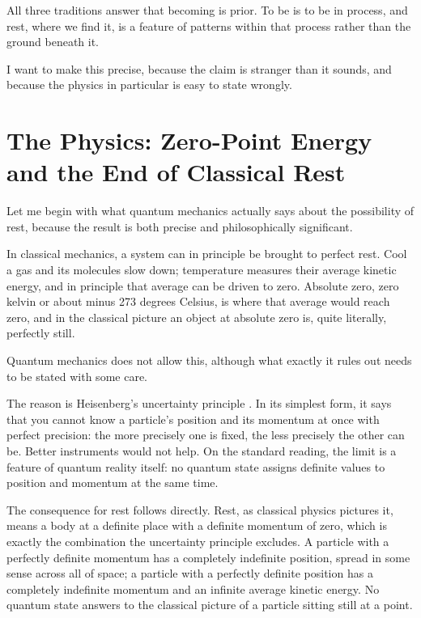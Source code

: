 All three traditions answer that becoming is prior. To be is to be in process, and rest, where we find it, is a feature of patterns within that process rather than the ground beneath it.

I want to make this precise, because the claim is stranger than it sounds, and because the physics in particular is easy to state wrongly.


\section{The Physics: Zero-Point Energy and the End of Classical Rest}
\label{sec:ch12-physics}

Let me begin with what quantum mechanics actually says about the possibility of rest, because the result is both precise and philosophically significant.

In classical mechanics, a system can in principle be brought to perfect rest. Cool a gas and its molecules slow down; temperature measures their average kinetic energy, and in principle that average can be driven to zero. Absolute zero, zero kelvin or about minus 273 degrees Celsius, is where that average would reach zero, and in the classical picture an object at absolute zero is, quite literally, perfectly still.

Quantum mechanics does not allow this, although what exactly it rules out needs to be stated with some care.

The reason is Heisenberg's uncertainty principle \citep{Heisenberg1927}. In its simplest form, it says that you cannot know a particle's position and its momentum at once with perfect precision: the more precisely one is fixed, the less precisely the other can be. Better instruments would not help. On the standard reading, the limit is a feature of quantum reality itself: no quantum state assigns definite values to position and momentum at the same time.

The consequence for rest follows directly. Rest, as classical physics pictures it, means a body at a definite place with a definite momentum of zero, which is exactly the combination the uncertainty principle excludes. A particle with a perfectly definite momentum has a completely indefinite position, spread in some sense across all of space; a particle with a perfectly definite position has a completely indefinite momentum and an infinite average kinetic energy. No quantum state answers to the classical picture of a particle sitting still at a point.

